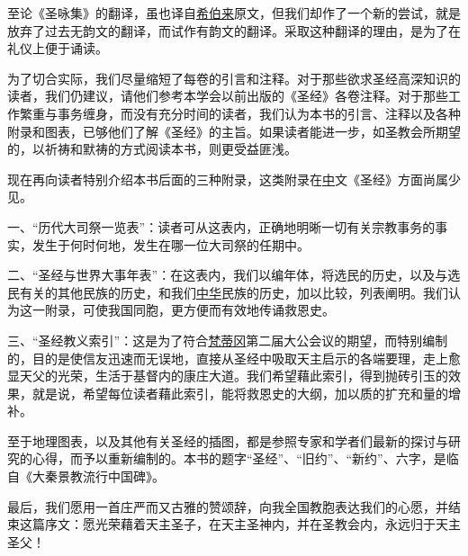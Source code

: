 至论《圣咏集》的翻译，虽也译自\uline{希伯来}原文，但我们却作了一个新的尝试，就是放弃了过去无韵文的翻译，而试作有韵文的翻译。采取这种翻译的理由，是为了在礼仪上便于诵读。

为了切合实际，我们尽量缩短了每卷的引言和注释。对于那些欲求圣经高深知识的读者，我们仍建议，请他们参考本学会以前出版的《圣经》各卷注释。对于那些工作繁重与事务缠身，而没有充分时间的读者，我们认为本书的引言、注释以及各种附录和图表，已够他们了解《圣经》的主旨。如果读者能进一步，如圣教会所期望的，以祈祷和默祷的方式阅读本书，则更受益匪浅。

现在再向读者特别介绍本书后面的三种附录，这类附录在\uline{中}文《圣经》方面尚属少见。

一、“历代大司祭一览表”：读者可从这表内，正确地明晰一切有关宗教事务的事实，发生于何时何地，发生在哪一位大司祭的任期中。

二、“圣经与世界大事年表”：在这表内，我们以编年体，将选民的历史，以及与选民有关的其他民族的历史，和我们\uline{中华}民族的历史，加以比较，列表阐明。我们认为这一附录，可使我国同胞，更方便而有效地传诵救恩史。

三、“圣经教义索引”：这是为了符合\uline{梵蒂冈}第二届大公会议的期望，而特别编制的，目的是使信友迅速而无误地，直接从圣经中吸取天主启示的各端要理，走上愈显天父的光荣，生活于基督内的康庄大道。我们希望藉此索引，得到抛砖引玉的效果，就是说，希望每位读者藉此索引，能将救恩史的大纲，加以质的扩充和量的增补。

至于地理图表，以及其他有关圣经的插图，都是参照专家和学者们最新的探讨与研究的心得，而予以重新编制的。本书的题字“圣经”、“旧约”、“新约”、六字，是临自《大秦景教流行中国碑》。

最后，我们愿用一首庄严而又古雅的赞颂辞，向我全国教胞表达我们的心愿，并结束这篇序文：愿光荣藉着天主圣子，在天主圣神内，并在圣教会内，永远归于天主圣父！


